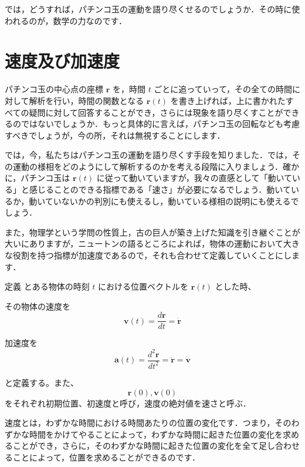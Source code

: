 \documentclass[
  b4paperpaper,
  xelatex,ja=standard]{bxjsbook}
\begin{document}
では，どうすれば，パチンコ玉の運動を語り尽くせるのでしょうか．その時に使われるのが，数学の力なのです．

\hypertarget{ux901fux5ea6ux53caux3073ux52a0ux901fux5ea6}{%
\section{速度及び加速度}\label{ux901fux5ea6ux53caux3073ux52a0ux901fux5ea6}}

パチンコ玉の中心点の座標 \(\boldsymbol{r}\) を，時間 \(t\)
ごとに追っていって，その全ての時間に対して解析を行い，時間の関数となる
\(\boldsymbol{r}(t)\)
を書き上げれば，上に書かれたすべての疑問に対して回答することができ，さらには現象を語り尽くすことができるのではないでしょうか．もっと具体的に言えば，パチンコ玉の回転なども考慮すべきでしょうが，今の所，それは無視することにします．

では，今，私たちはパチンコ玉の運動を語り尽くす手段を知りました．では，その運動の様相をどのようにして解析するのかを考える段階に入りましょう．確かに，パチンコ玉は
\(\boldsymbol{r}(t)\)
に従って動いていますが，我々の直感として「動いている」と感じることのできる指標である「速さ」が必要になるでしょう．動いているか，動いていないかの判別にも使えるし，動いている様相の説明にも使えるでしょう．

また，物理学という学問の性質上，古の巨人が築き上げた知識を引き継ぐことが大いにありますが，ニュートンの語るところによれば，物体の運動において大きな役割を持つ指標が加速度であるので，それも合わせて定義していくことにします．

\begin{Dbox}{定義}
とある物体の時刻 \(t\) における位置ベクトルを \(\boldsymbol{r}(t)\)
とした時、

その物体の速度を
\[\boldsymbol{v}(t)=\frac{d\boldsymbol{r}}{dt}=\dot{\boldsymbol{r}}\]

加速度を
\[\boldsymbol{a}(t)=\frac{d^2\boldsymbol{r}}{dt^2}=\ddot{\boldsymbol{r}}=\dot{\boldsymbol{v}}\]

と定義する。また、 \[\boldsymbol{r}(0),\boldsymbol{v}(0)\]
をそれぞれ初期位置、初速度と呼び，速度の絶対値を速さと呼ぶ．

\end{Dbox}

速度とは，わずかな時間における時間あたりの位置の変化です．つまり，そのわずかな時間をかけてやることによって，わずかな時間に起きた位置の変化を求めることができ，さらに，そのわずかな時間に起きた位置の変化を全て足し合わせることによって，位置を求めることができるのです．
\end{document}
